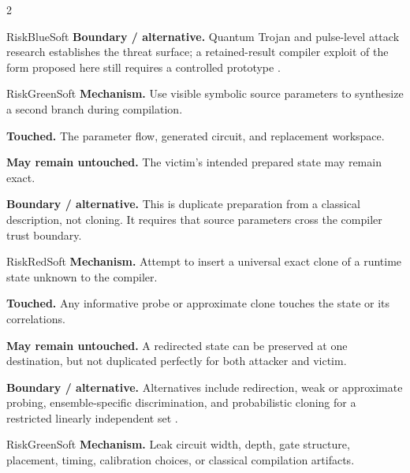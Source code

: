\begin{multicols}{2}
\begin{matrixrecord}{RiskBlueSoft}
\textbf{Boundary / alternative.} Quantum Trojan and pulse-level attack research establishes the threat surface; a retained-result compiler exploit of the form proposed here still requires a controlled prototype \cite{john2025trojan,xu2024pulseattacks}.

\hfill\matrixback
\end{matrixrecord}

\hypertarget{cell:C3}{}
\begin{matrixrecord}{RiskGreenSoft}
\textbf{Mechanism.} Use visible symbolic source parameters to synthesize a second branch during compilation.

\textbf{Touched.} The parameter flow, generated circuit, and replacement workspace.

\textbf{May remain untouched.} The victim's intended prepared state may remain exact.

\textbf{Boundary / alternative.} This is duplicate preparation from a classical description, not cloning. It requires that source parameters cross the compiler trust boundary.

\hfill\matrixback
\end{matrixrecord}

\hypertarget{cell:C4}{}
\begin{matrixrecord}{RiskRedSoft}
\textbf{Mechanism.} Attempt to insert a universal exact clone of a runtime state unknown to the compiler.

\textbf{Touched.} Any informative probe or approximate clone touches the state or its correlations.

\textbf{May remain untouched.} A redirected state can be preserved at one destination, but not duplicated perfectly for both attacker and victim.

\textbf{Boundary / alternative.} Alternatives include redirection, weak or approximate probing, ensemble-specific discrimination, and probabilistic cloning for a restricted linearly independent set \cite{wootters1982cloning,duan1998probabilistic}.

\hfill\matrixback
\end{matrixrecord}

\hypertarget{cell:C5}{}
\begin{matrixrecord}{RiskGreenSoft}
\textbf{Mechanism.} Leak circuit width, depth, gate structure, placement, timing, calibration choices, or classical compilation artifacts.


\end{matrixrecord}
\end{multicols}
